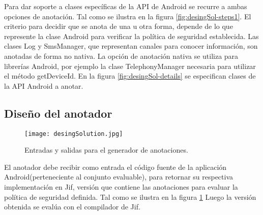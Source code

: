 Para dar soporte a clases específicas de la API de Android se recurre a ambas
opciones de anotación. Tal como se ilustra en la figura
\ref{fig:desingSol-steps1}.\newline 
El criterio para decidir que se anota de una u otra forma, depende de lo que
represente la clase Android para verificar la política de seguridad
establecida.\newline
Las clases Log y SmsManager, que representan canales para conocer información,
son anotadas de forma no nativa.\newline
La opción de anotación nativa se utiliza
para librerías Android, por ejemplo la clase TelephonyManager necesaria para utilizar
el método getDeviceId.\newline
En la figura \ref{fig:desingSol-details} se
especifican clases de la API Android a anotar.\newline

\subsection{Diseño del anotador}
\label{subsec:anotador}
\label{subsec:pasosSol}
\begin{figure}[H]
	\begin{center}
	\texttt{[image: desingSolution.jpg]}
	\end{center}
	\caption{Entradas y salidas para el generador de anotaciones.}
	\label{fig:desingSolution} 
\end{figure}

El anotador debe recibir como entrada el código fuente de la aplicación
Android(perteneciente al conjunto evaluable), para retornar su respectiva
implementación en Jif, versión que contiene las anotaciones para evaluar la
política de seguridad definida. Tal como se ilustra en la figura
\ref{fig:desingSolution}\newline 
Luego la versión obtenida se evalúa con el compilador de Jif.

